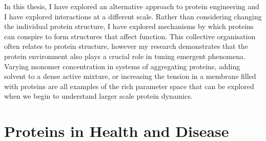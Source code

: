 In this thesis, I have explored an alternative approach to protein engineering and I have explored interactions at a different scale. Rather than considering changing the individual protein structure, I have explored mechanisms by which proteins can conspire to form structures that affect function. This collective organisation often relates to protein structure, however my research demonstrates that the protein environment also plays a crucial role in tuning emergent phenomena. Varying monomer concentration in systems of aggregating proteins, adding solvent to a dense active mixture, or increasing the tension in a membrane filled with proteins are all examples of the rich parameter space that can be explored when we begin to understand larger scale protein dynamics.








\section{Proteins in Health and Disease}

